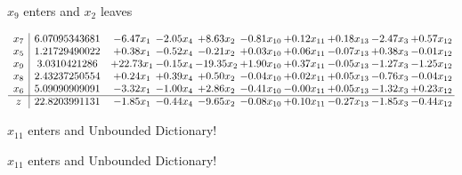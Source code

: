 \documentclass[9pt]{article}
\begin{document}
 $ x_{9} $ enters and $ x_{2} $ leaves 

 \[\begin{array}{c| c c@{\hskip 2pt} c@{\hskip 2pt} c@{\hskip 2pt} c@{\hskip 2pt} c@{\hskip 2pt} c@{\hskip 2pt} c@{\hskip 2pt} c@{\hskip 2pt} }
 x_{7}   &  6.07095343681 & -6.47 x_{1} & -2.05 x_{4} & +  8.63 x_{2} & -0.81 x_{10} & +  0.12 x_{11} & +  0.18 x_{13} & -2.47 x_{3} & +  0.57 x_{12}\\
 x_{5}   &  1.21729490022 & +  0.38 x_{1} & -0.52 x_{4} & -0.21 x_{2} & +  0.03 x_{10} & +  0.06 x_{11} & -0.07 x_{13} & +  0.38 x_{3} & -0.01 x_{12}\\
 x_{9}   &  3.0310421286 & + 22.73 x_{1} & -0.15 x_{4} & -19.35 x_{2} & +  1.90 x_{10} & +  0.37 x_{11} & -0.05 x_{13} & -1.27 x_{3} & -1.25 x_{12}\\
 x_{8}   &  2.43237250554 & +  0.24 x_{1} & +  0.39 x_{4} & +  0.50 x_{2} & -0.04 x_{10} & +  0.02 x_{11} & +  0.05 x_{13} & -0.76 x_{3} & -0.04 x_{12}\\
 x_{6}   &  5.09090909091 & -3.32 x_{1} & -1.00 x_{4} & +  2.86 x_{2} & -0.41 x_{10} & -0.00 x_{11} & +  0.05 x_{13} & -1.32 x_{3} & +  0.23 x_{12}\\
\hline
z    &  22.8203991131 & -1.85 x_{1} & -0.44 x_{4} & -9.65 x_{2} & -0.08 x_{10} & +  0.10 x_{11} & -0.27 x_{13} & -1.85 x_{3} & -0.44 x_{12}\\
\end{array}\]


 $ x_{11} $ enters and Unbounded Dictionary!


 $ x_{11} $ enters and Unbounded Dictionary!
\end{document}
